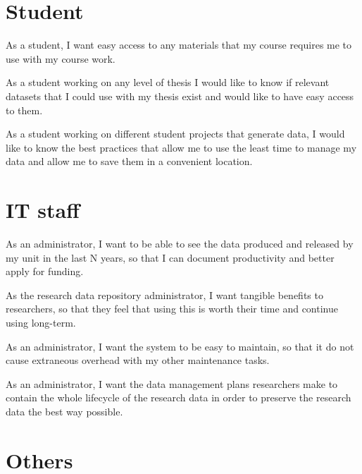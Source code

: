 \section{Student}

\begin{compactitem}
    \item As a student, I want easy access to any materials that my course
          requires me to use with my course work.
    \item As a student working on any level of thesis I would like to know if
          relevant datasets that I could use with my thesis exist and would
          like to have easy access to them.
    \item As a student working on different student projects that generate
          data, I would like to know the best practices that allow me to use
          the least time to manage my data and allow me to save them in a
          convenient location.
\end{compactitem}

\section{IT staff}

\begin{compactitem}
    \item As an administrator, I want to be able to see the data produced and
          released by my unit in the last N years, so that I can document
          productivity and better apply for funding.
    \item As the research data repository administrator, I want tangible benefits to
          researchers, so that they feel that using this is worth their time and
          continue using long-term.
    \item As an administrator, I want the system to be easy to maintain, so
          that it do not cause extraneous overhead with my other maintenance
          tasks.
    \item As an administrator, I want the data management plans researchers make to contain the
          whole lifecycle of the research data in order to preserve the research data the best way
          possible.
\end{compactitem}

\section{Others}

